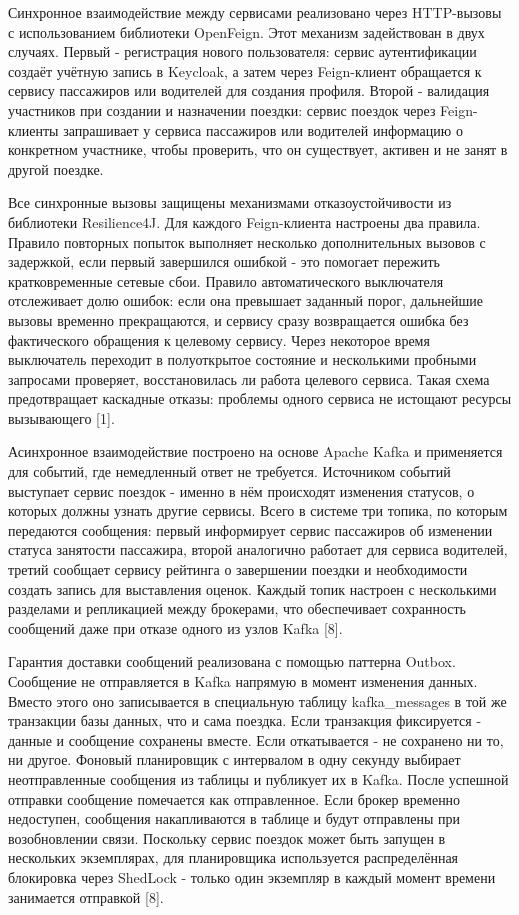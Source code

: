 {\par \redline Синхронное взаимодействие между сервисами реализовано через HTTP-вызовы с использованием библиотеки OpenFeign. Этот механизм задействован в двух случаях. Первый - регистрация нового пользователя: сервис аутентификации создаёт учётную запись в Keycloak, а затем через Feign-клиент обращается к сервису пассажиров или водителей для создания профиля. Второй - валидация участников при создании и назначении поездки: сервис поездок через Feign-клиенты запрашивает у сервиса пассажиров или водителей информацию о конкретном участнике, чтобы проверить, что он существует, активен и не занят в другой поездке.

\par \redline Все синхронные вызовы защищены механизмами отказоустойчивости из библиотеки Resilience4J. Для каждого Feign-клиента настроены два правила. Правило повторных попыток выполняет несколько дополнительных вызовов с задержкой, если первый завершился ошибкой - это помогает пережить кратковременные сетевые сбои. Правило автоматического выключателя отслеживает долю ошибок: если она превышает заданный порог, дальнейшие вызовы временно прекращаются, и сервису сразу возвращается ошибка без фактического обращения к целевому сервису. Через некоторое время выключатель переходит в полуоткрытое состояние и несколькими пробными запросами проверяет, восстановилась ли работа целевого сервиса. Такая схема предотвращает каскадные отказы: проблемы одного сервиса не истощают ресурсы вызывающего [1].

\par \redline Асинхронное взаимодействие построено на основе Apache Kafka и применяется для событий, где немедленный ответ не требуется. Источником событий выступает сервис поездок - именно в нём происходят изменения статусов, о которых должны узнать другие сервисы. Всего в системе три топика, по которым передаются сообщения: первый информирует сервис пассажиров об изменении статуса занятости пассажира, второй аналогично работает для сервиса водителей, третий сообщает сервису рейтинга о завершении поездки и необходимости создать запись для выставления оценок. Каждый топик настроен с несколькими разделами и репликацией между брокерами, что обеспечивает сохранность сообщений даже при отказе одного из узлов Kafka [8].

\par \redline Гарантия доставки сообщений реализована с помощью паттерна Outbox. Сообщение не отправляется в Kafka напрямую в момент изменения данных. Вместо этого оно записывается в специальную таблицу kafka\_messages в той же транзакции базы данных, что и сама поездка. Если транзакция фиксируется - данные и сообщение сохранены вместе. Если откатывается - не сохранено ни то, ни другое. Фоновый планировщик с интервалом в одну секунду выбирает неотправленные сообщения из таблицы и публикует их в Kafka. После успешной отправки сообщение помечается как отправленное. Если брокер временно недоступен, сообщения накапливаются в таблице и будут отправлены при возобновлении связи. Поскольку сервис поездок может быть запущен в нескольких экземплярах, для планировщика используется распределённая блокировка через ShedLock - только один экземпляр в каждый момент времени занимается отправкой [8].

}

